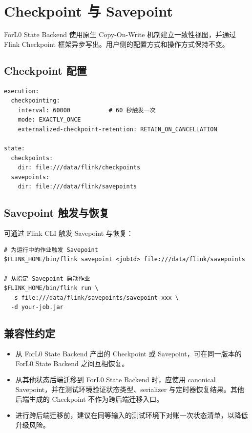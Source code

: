 \documentclass[a4paper,11pt]{article}
\newcommand{\project}{ForL0 State Backend}
\begin{document}
\section{Checkpoint 与 Savepoint}

\project{} 使用原生 Copy-On-Write 机制建立一致性视图，并通过 Flink Checkpoint 框架异步写出。用户侧的配置方式和操作方式保持不变。

\subsection{Checkpoint 配置}

\begin{lstlisting}[language=yamlcmd]
execution:
  checkpointing:
    interval: 60000           # 60 秒触发一次
    mode: EXACTLY_ONCE
    externalized-checkpoint-retention: RETAIN_ON_CANCELLATION

state:
  checkpoints:
    dir: file:///data/flink/checkpoints
  savepoints:
    dir: file:///data/flink/savepoints
\end{lstlisting}

\subsection{Savepoint 触发与恢复}

可通过 Flink CLI 触发 Savepoint 与恢复：

\begin{lstlisting}[language=shellcmd]
# 为运行中的作业触发 Savepoint
$FLINK_HOME/bin/flink savepoint <jobId> file:///data/flink/savepoints

# 从指定 Savepoint 启动作业
$FLINK_HOME/bin/flink run \
  -s file:///data/flink/savepoints/savepoint-xxx \
  -d your-job.jar
\end{lstlisting}

\subsection{兼容性约定}

\begin{itemize}
  \item 从 \project{} 产出的 Checkpoint 或 Savepoint，可在同一版本的 \project{} 之间互相恢复。
  \item 从其他状态后端迁移到 \project{} 时，应使用 canonical Savepoint，并在测试环境验证状态类型、serializer 与定时器恢复结果。其他后端生成的 Checkpoint 不作为跨后端迁移入口。
  \item 进行跨后端迁移前，建议在同等输入的测试环境下对账一次状态清单，以降低升级风险。
\end{itemize}
\end{document}

